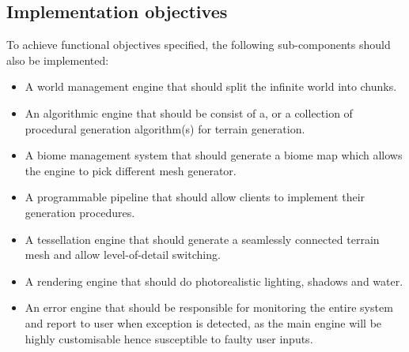 \documentclass[oneside, a4paper]{article}
\begin{document}
    \subsection{Implementation objectives}
    To achieve functional objectives specified, the following sub-components should also be implemented:
    \begin{itemize}[label=\(\diamond\)]
        \item A world management engine that should split the infinite world into chunks.
        \item An algorithmic engine that should be consist of a, or a collection of procedural generation algorithm(s) for terrain generation.
        \item A biome management system that should generate a biome map which allows the engine to pick different mesh generator.
        \item A programmable pipeline that should allow clients to implement their generation procedures.
        \item A tessellation engine that should generate a seamlessly connected terrain mesh and allow level-of-detail switching.
        \item A rendering engine that should do photorealistic lighting, shadows and water.
        \item An error engine that should be responsible for monitoring the entire system and report to user when exception is detected, as the main engine will be highly customisable hence susceptible to faulty user inputs.
    \end{itemize}
\end{document}
